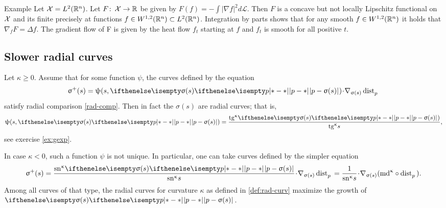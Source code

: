 \begin{thm}{Example}
Let $\mathcal{X}=L^2(\mathbb{R}^n)$. Let $F\co \spc{X}\to \R$ be given  by $F(f)=-\int|\nabla f|^2d\mathcal L$.
Then $F$ is a concave but not locally Lipschitz functional on $\mathcal{X}$ and its finite precisely at functions $f\in W^{1,2}(\R^n)\subset L^2(\R^n)$.
Integration by parts shows that for any smooth $f\in W^{1,2}(\R^n)$ it holds that $\nabla_fF=\Delta f$.
The gradient flow of F is given by the heat flow $f_t$ starting at $f$ and $f_t$ is smooth for all positive $t$.
\end{thm}

\subsection*{Slower radial curves}
Let $\kappa\ge 0$. 
Assume that for some function $\psi$, the curves defined by the equation 
\[\sigma^+(s)=\psi(s,\dist{p}{\sigma(s)}{})\cdot\nabla_{\sigma(s)}\distfun{p}{}{}\]
satisfy radial comparison \ref{rad-comp}.
Then in fact the $\sigma(s)$ are radial curves; 
that is, 
\[\psi(s,\dist{p}{\sigma(s)}{})= \frac{\tang\kappa\dist[{{}}]{p}{\sigma(s)}{})}{\tang\kappa s},\]
see exercise \ref{ex:gexp}.

In case $\kappa<0$, such a function $\psi$ is not unique.
In particular, one can take curves defined by the simpler equation
\[\sigma^+(s)
=
\frac{\sn\kappa \dist[{{}}]{p}{\sigma(s)}{}}{\sn\kappa s}\cdot\nabla_{\sigma(s)}\distfun{p}{}{}
=
\frac{1}{\sn\kappa s}\cdot\nabla_{\sigma(s)}(\md\kappa\circ\distfun{p}{}{}).\]
Among all curves of that type, the radial curves for curvature $\kappa$ 
as defined in \ref{def:rad-curv} maximize the growth of $\dist{p}{\sigma(s)}{}$.




